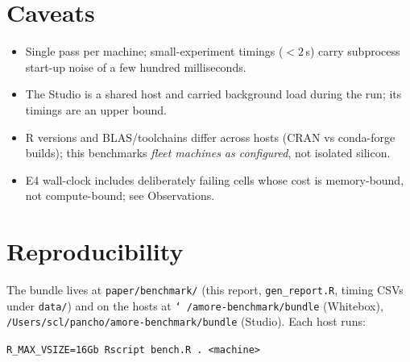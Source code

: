 \documentclass[11pt]{article}
\begin{document}
\section{Caveats}

\begin{itemize}\itemsep2pt
  \item Single pass per machine; small-experiment timings ($<2$\,s) carry
        subprocess start-up noise of a few hundred milliseconds.
  \item The Studio is a shared host and carried background load during the
        run; its timings are an upper bound.
  \item R versions and BLAS/toolchains differ across hosts (CRAN vs
        conda-forge builds); this benchmarks \emph{fleet machines as
        configured}, not isolated silicon.
  \item E4 wall-clock includes deliberately failing cells whose cost is
        memory-bound, not compute-bound; see Observations.
\end{itemize}

\section{Reproducibility}

The bundle lives at \texttt{paper/benchmark/} (this report,
\texttt{gen\_report.R}, timing CSVs under \texttt{data/}) and on the hosts at
\texttt{\char`~/amore-benchmark/bundle} (Whitebox),
\texttt{/Users/scl/pancho/amore-benchmark/bundle} (Studio). Each host runs:
\begin{center}
\texttt{R\_MAX\_VSIZE=16Gb Rscript bench.R . <machine>}
\end{center}
\end{document}
